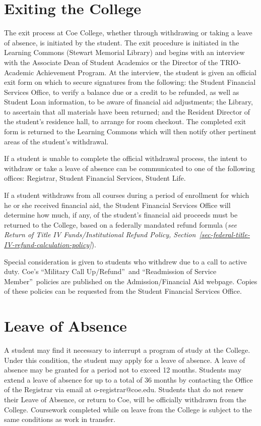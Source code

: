 \documentclass[
  letterpaper,
]{scrbook}
\begin{document}
\section{Exiting the College}\label{sec-official-withdrawal-process}

The exit process at Coe College, whether through withdrawing or taking a
leave of absence, is initiated by the student. The exit procedure is
initiated in the Learning Commons (Stewart Memorial Library) and begins
with an interview with the Associate Dean of Student Academics or the
Director of the TRIO-Academic Achievement Program. At the interview, the
student is given an official exit form on which to secure signatures
from the following: the Student Financial Services Office, to verify a
balance due or a credit to be refunded, as well as Student Loan
information, to be aware of financial aid adjustments; the Library, to
ascertain that all materials have been returned; and the Resident
Director of the student's residence hall, to arrange for room checkout.
The completed exit form is returned to the Learning Commons which will
then notify other pertinent areas of the student's withdrawal.

If a student is unable to complete the official withdrawal process, the
intent to withdraw or take a leave of absence can be communicated to one
of the following offices: Registrar, Student Financial Services, Student
Life.

If a student withdraws from all courses during a period of enrollment
for which he or she received financial aid, the Student Financial
Services Office will determine how much, if any, of the student's
financial aid proceeds must be returned to the College, based on a
federally mandated refund formula (\emph{see Return of Title IV
Funds/Institutional Refund Policy,
Section~\ref{sec-federal-title-IV-refund-calculation-policy}}).

Special consideration is given to students who withdrew due to a call to
active duty. Coe's ``Military Call Up/Refund''~and ``Readmission of
Service Member''~policies are published on the Admission/Financial Aid
webpage. Copies of these policies can be requested from the Student
Financial Services Office.

\section{Leave of Absence}\label{leave-of-absence}

A student may find it necessary to interrupt a program of study at the
College. Under this condition, the student may apply for a leave of
absence. A leave of absence may be granted for a period not to exceed 12
months. Students may extend a leave of absence for up to a total of 36
months by contacting the Office of the Registrar via email at
o-registrar@coe.edu. Students that do not renew their Leave of Absence,
or return to Coe, will be officially withdrawn from the College.
Coursework completed while on leave from the College is subject to the
same conditions as work in transfer.
\end{document}
